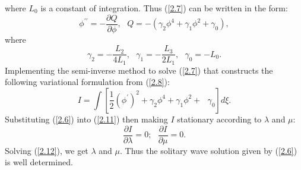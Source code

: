 \documentclass[12pt]{llncs}
\begin{document}
where $L_{0}$ is a constant of integration. Thus (\ref{2.7}) can be written in the
form:%
\begin{equation}\label{2.9}
	\phi^{\prime \prime }=-\frac{\partial Q}{\partial \phi},\text{ }Q=-\left( \gamma
	_{2}\phi^{4}+\gamma _{1}\phi^{2}+\gamma _{0}\right) ,
\end{equation}%
where 
\begin{equation}\label{2.10}
	\gamma _{2}=-\frac{L_{2}}{4L_{1}},\text{ }\gamma _{1}=-\frac{L_{3}}{2L_{1}}, 
	\text{ }\gamma _{0}=-L_{0}.
\end{equation}%
Implementing the semi-inverse method \cite{He:1997,He:2006,N.Kudryashov:2009}  to solve (\ref{2.7}) that constructs
the following variational formulation from (\ref{2.8}):%
\begin{equation}\label{2.11}
	I=\int \left[ \frac{1}{2}\left( \phi^{\prime }\right) ^{2}+\gamma
	_{2}\phi^{4}+\gamma _{1}\phi^{2}+\text{ }\gamma _{0}\right] d\xi .
\end{equation}
Substituting (\ref{2.6}) into (\ref{2.11}) then making $I$ stationary according
to $\lambda $ and $\mu $:%
\begin{equation}\label{2.12}
	\frac{\partial I}{\partial \lambda}=0;\text{ }\frac{\partial I}{\partial
		\mu}=0.
\end{equation}
Solving (\ref{2.12}), we get $\lambda $ and $\mu.$ Thus the solitary wave solution given by (\ref{2.6})
is well determined. 
\end{document}
